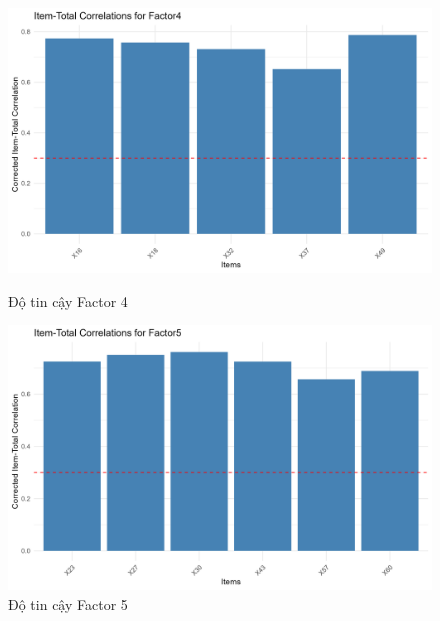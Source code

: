 \begin{figure}[h!]
    \centering
    \begin{minipage}{0.48\textwidth}
        \centering
        \includegraphics[width=\linewidth]{../../assets/images/reliability_Factor4.png}
        \caption{Độ tin cậy Factor 4}
        \label{fig:h5}
    \end{minipage}
    \hfill
    \begin{minipage}{0.48\textwidth}
        \centering
        \includegraphics[width=\linewidth]{../../assets/images/reliability_Factor5.png}
        \caption{Độ tin cậy Factor 5}
        \label{fig:h6}
    \end{minipage}
\end{figure}

